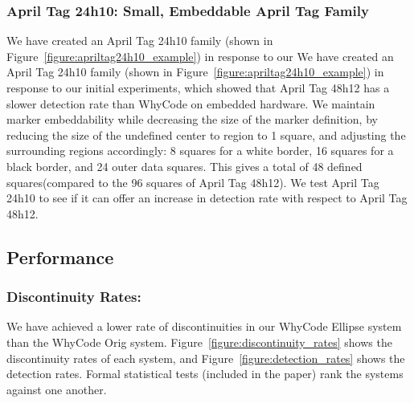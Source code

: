 \subsubsection{April Tag 24h10: Small, Embeddable April Tag Family}
We have created an April Tag 24h10 family (shown in Figure~\ref{figure:apriltag24h10_example}) in response to our
We have created an April Tag 24h10 family (shown in Figure~\ref{figure:apriltag24h10_example}) in response to our
initial experiments, which showed that April Tag 48h12 has a slower detection rate than WhyCode on embedded hardware.
We maintain marker embeddability while decreasing the size of the marker definition,
by reducing the size of the undefined center to region to 1 square, and adjusting the surrounding regions accordingly:
8 squares for a white border, 16 squares for a black border, and 24 outer data squares.
This gives a total of 48 defined squares(compared to the 96 squares of April Tag 48h12).
We test April Tag 24h10 to see if it can offer an increase in detection rate with respect to April Tag 48h12.

\subsection{Performance}

\subsubsection{Discontinuity Rates:}
We have achieved a lower rate of discontinuities in our WhyCode Ellipse system than the WhyCode Orig system.
Figure~\ref{figure:discontinuity_rates} shows the discontinuity rates of each system,
and Figure~\ref{figure:detection_rates} shows the detection rates.
Formal statistical tests (included in the paper) rank the systems against one another.

